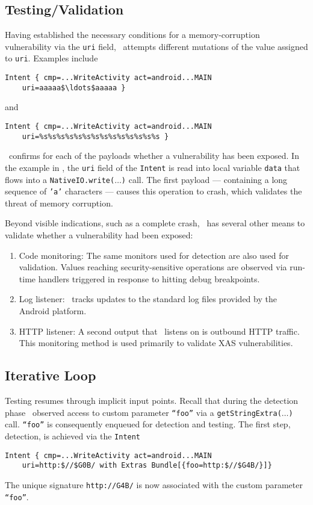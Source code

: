 \subsection{Testing/Validation}

Having established the necessary conditions for a memory-corruption vulnerability via the {\tt uri} field, \Tool\ attempts different mutations of the value assigned to {\tt uri}. Examples include
\begin{lstlisting}[numbers=none]
Intent { cmp=...WriteActivity act=android...MAIN 
	uri=aaaaa$\ldots$aaaaa }
\end{lstlisting}
and
\begin{lstlisting}[numbers=none]
Intent { cmp=...WriteActivity act=android...MAIN 
	uri=%s%s%s%s%s%s%s%s%s%s%s%s%s%s }
\end{lstlisting}

\Tool\ confirms for each of the payloads whether a vulnerability has been exposed. In the example in , the {\tt uri} field of the {\tt Intent} is read into local variable {\tt data} that flows into a {\tt NativeIO.write($\ldots$)} call.  The first payload --- containing a long sequence of {\tt 'a'} characters --- causes this operation to crash, which validates the threat of memory corruption.

Beyond visible indications, such as a complete crash, \Tool\ has several other means to validate whether a vulnerability had been exposed:
\begin{enumerate}
	\item Code monitoring: The same monitors used for detection are also used for validation.
	Values reaching security-sensitive operations are observed via run-time handlers 
	triggered in response to hitting debug breakpoints.
	\item Log listener: \Tool\ tracks updates to the standard log files provided by the Android platform. 
	\item HTTP listener: A second output that \Tool\ listens on is outbound HTTP traffic. This monitoring method is used primarily to validate XAS vulnerabilities.
\end{enumerate} 

\subsection{Iterative Loop}\label{Se:iterative}

Testing resumes through implicit input points. Recall that during the detection phase \Tool\ observed access to custom parameter {\tt ``foo''} via a {\tt getStringExtra($\ldots$)} call. {\tt ``foo''} is consequently enqueued for detection and testing. The first step, detection, is achieved via the {\tt Intent}
\begin{lstlisting}[numbers=none]
Intent { cmp=...WriteActivity act=android...MAIN 
	uri=http:$//$G0B/ with Extras Bundle[{foo=http:$//$G4B/}]}
\end{lstlisting}
The unique signature {\tt http://G4B/} is now associated with the custom parameter {\tt ``foo''}. 

